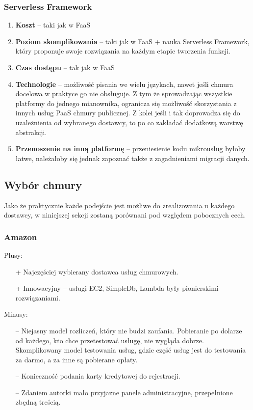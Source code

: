 \documentclass[12pt,a4paper,twoside,titlepage,openright]{book}
\begin{document}
\subsubsection{Serverless Framework}

\begin{enumerate}
	\item \textbf{Koszt} -- taki jak w FaaS
	\item \textbf{Poziom skomplikowania} -- taki jak w FaaS + nauka Serverless Framework, który proponuje swoje rozwiązania na każdym etapie tworzenia funkcji. 
	\item \textbf{Czas dostępu} -- tak jak w FaaS
	\item \textbf{Technologie} -- możliwość pisania we wielu językach, nawet jeśli chmura docelowa w praktyce go nie obsługuje. Z tym że sprowadzając wszystkie platformy do jednego mianownika, ogranicza się możliwość skorzystania z innych usług PaaS chmury publicznej. Z kolei jeśli i tak doprowadza się do uzależnienia od wybranego dostawcy, to po co zakładać dodatkową warstwę abstrakcji.
	\item \textbf{Przenoszenie na inną platformę} -- przeniesienie kodu mikrousług byłoby łatwe, należałoby się jednak zapoznać także z zagadnieniami migracji danych.
\end{enumerate}
	
\subsection{Wybór chmury}

Jako że praktycznie każde podejście jest możliwe do zrealizowania u każdego dostawcy, w niniejszej sekcji zostaną porównani pod względem pobocznych cech.

\subsubsection{Amazon}

Plusy:
\begin{itemize}
\item[+] Najczęściej wybierany dostawca usług chmurowych.
\item[+] Innowacyjny -- usługi EC2, SimpleDb, Lambda były pionierskimi rozwiązaniami.
\end{itemize}

\noindent
Minusy:
\begin{itemize}
\item[--] Niejasny model rozliczeń, który nie budzi zaufania. Pobieranie po dolarze od każdego, kto chce przetestować usługę, nie wygląda dobrze. Skomplikowany model testowania usług, gdzie część usług jest do testowania za darmo, a za inne są pobierane opłaty. 
\item[--] Konieczność podania karty kredytowej do rejestracji.
\item[--] Zdaniem autorki mało przyjazne panele administracyjne, przepełnione zbędną treścią.
\end{itemize}
\end{document}
